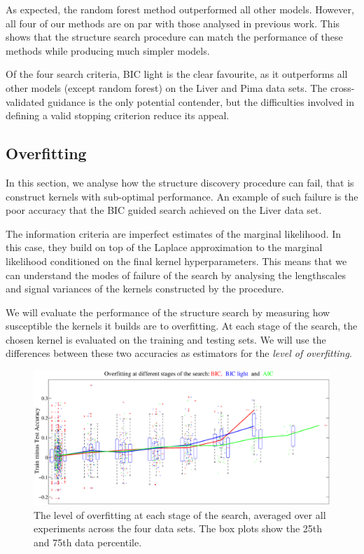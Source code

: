 \documentclass[a4paper,12pt ]{report}
\begin{document}
As expected, the random forest method outperformed all other models. However, all four of our methods are on par with those analysed in previous work. This shows that the structure search procedure can match the performance of these methods while producing much simpler models.

Of the four search criteria, BIC light is the clear favourite, as it outperforms all other models (except random forest) on the Liver and Pima data sets. The cross-validated guidance is the only potential contender, but the difficulties involved in defining a valid stopping criterion reduce its appeal.

\subsection{Overfitting}

In this section, we analyse how the structure discovery procedure can fail, that is construct kernels with sub-optimal performance. An example of such failure is the poor accuracy that the BIC guided search achieved on the Liver data set.

The information criteria are imperfect estimates of the marginal likelihood. In this case, they build on top of the Laplace approximation to the marginal likelihood conditioned on the final kernel hyperparameters. This means that we can understand the modes of failure of the search by analysing the lengthscales and signal variances of the kernels constructed by the procedure.

We will evaluate the performance of the structure search by measuring how susceptible the kernels it builds are to overfitting. At each stage of the search, the chosen kernel is evaluated on the training and testing sets. We will use the differences between these two accuracies as estimators for the \emph{level of overfitting}.


\begin{figure} [!ht]

\begin{center}
\includegraphics[trim=0cm 0cm 0cm 0cm, width=1\textwidth]{figures/overfitting}
\end{center}

\caption{The level of overfitting at each stage of the search, averaged over all experiments across the four data sets. The box plots show the 25th and 75th data percentile.}

\end{figure}
\end{document}
